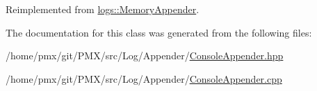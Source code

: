 Reimplemented from \hyperlink{classlogs_1_1MemoryAppender_a478c866b07f63f1f89c347b4465834bc}{logs\+::\+Memory\+Appender}.



The documentation for this class was generated from the following files\+:\begin{DoxyCompactItemize}
\item 
/home/pmx/git/\+P\+M\+X/src/\+Log/\+Appender/\hyperlink{ConsoleAppender_8hpp}{Console\+Appender.\+hpp}\item 
/home/pmx/git/\+P\+M\+X/src/\+Log/\+Appender/\hyperlink{ConsoleAppender_8cpp}{Console\+Appender.\+cpp}\end{DoxyCompactItemize}
